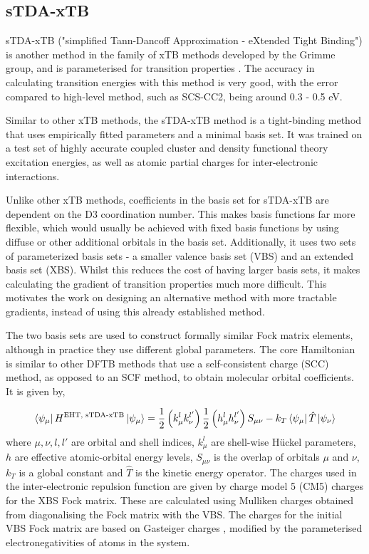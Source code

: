 \subsection{sTDA-xTB}
\label{subsec:stda_xtb}
sTDA-xTB ("simplified Tann-Dancoff Approximation - eXtended Tight Binding") is another
method in the family of xTB methods developed by the Grimme group, and is parameterised
for transition properties \cite{Grimme2016}. The accuracy in calculating transition energies with this
method is very good, with the error compared to high-level method, such as SCS-CC2,
being around 0.3 - 0.5 eV.

Similar to other xTB methods, the sTDA-xTB method is a tight-binding method that
uses empirically fitted parameters and a minimal basis set. It was trained on a
test set of highly accurate coupled cluster and density functional theory
excitation energies, as well as atomic partial charges for inter-electronic interactions.

Unlike other xTB methods, coefficients in the basis set for sTDA-xTB are dependent on the D3
coordination number. This makes basis functions far more flexible, which would usually
be achieved with fixed basis functions by using diffuse or other additional orbitals in
the basis set. Additionally, it uses two sets of parameterized basis sets - a
smaller valence basis set (VBS) and an extended basis set (XBS). Whilst this reduces
the cost of having larger basis sets, it makes calculating the gradient of transition
properties much more difficult. This motivates the work on designing an alternative
method with more tractable gradients, instead of using this already established method.

The two basis sets are used to construct formally similar Fock matrix elements,
although in practice they use different global parameters. The core Hamiltonian
is similar to other DFTB methods that use a self-consistent charge (SCC) method, as
opposed to an SCF method, to obtain molecular orbital coefficients. It is given by,

\begin{equation}
\bra{\psi_\mu} H^{\text{EHT, sTDA-xTB}} \ket{\psi_\mu}= \frac{1}{2} \left(k^l_\mu k^{l'}_\nu\right) \frac{1}{2} \left(h^l_\mu h^{l'}_\nu\right) S_{\mu\nu} - k_T \bra{\psi_\mu}\hat{T}\ket{\psi_\nu}
\end{equation}
%
where $\mu,\nu,l,l'$ are orbital and shell indices, $k^l_\mu$ are shell-wise 
H{\"u}ckel parameters, $h$ are effective atomic-orbital energy levels, $S_{\mu\nu}$
is the overlap of orbitals $\mu$ and $\nu$, $k_T$ is a global constant and $\hat{T}$
is the kinetic energy operator. The charges used in the inter-electronic repulsion 
function are given by charge model 5 (CM5) \cite{Marenich2012} charges for the XBS
Fock matrix. These are calculated using Mulliken charges obtained from diagonalising
the Fock matrix with the VBS. The charges for the initial VBS Fock matrix are based
on Gasteiger charges \cite{Gasteiger1978}, modified by the parameterised
electronegativities of atoms in the system.

